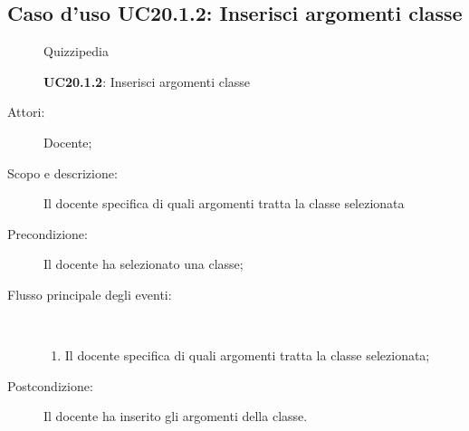 \subsection{Caso d'uso UC20.1.2: Inserisci argomenti classe}
	\begin{figure}[H]
		\centering
		\begin{resizedtikzpicture}{\textwidth}
		\begin{umlsystem}[x=0, fill=lightgray!20]{Quizzipedia}
		\end{umlsystem}
		\end{resizedtikzpicture}
		\caption{\textbf{UC20.1.2}: Inserisci argomenti classe}
		\label{UC20.1.2}
	\end{figure}
\begin{description}
\item[Attori:] Docente;
\item[Scopo e descrizione:] Il docente specifica di quali argomenti tratta la classe selezionata
      \item[Precondizione:] Il docente ha selezionato una classe;

        \item[Flusso principale degli eventi:] \ 
 \begin{enumerate}
          \item Il docente specifica di quali argomenti tratta la classe selezionata;

      \end{enumerate}
    \item[Postcondizione:] Il docente ha inserito gli argomenti della classe.
  \end{description}
\hypertarget{UC20.1.3}{}
